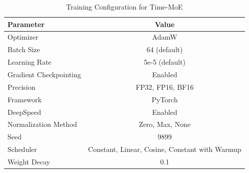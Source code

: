\begin{table}[h!]
\centering
\begin{tabular}{lc}
\hline
\textbf{Parameter} & \textbf{Value} \\
\hline
Optimizer & AdamW \\
Batch Size & 64 (default) \\
Learning Rate & 5e-5 (default) \\
Gradient Checkpointing & Enabled \\
Precision & FP32, FP16, BF16 \\
Framework & PyTorch \\
DeepSpeed & Enabled \\
Normalization Method & Zero, Max, None \\
Seed & 9899 \\
Scheduler & Constant, Linear, Cosine, Constant with Warmup \\
Weight Decay & 0.1 \\
\hline
\end{tabular}
\caption{Training Configuration for Time-MoE}
\label{tab:timemoe_training}
\end{table}

